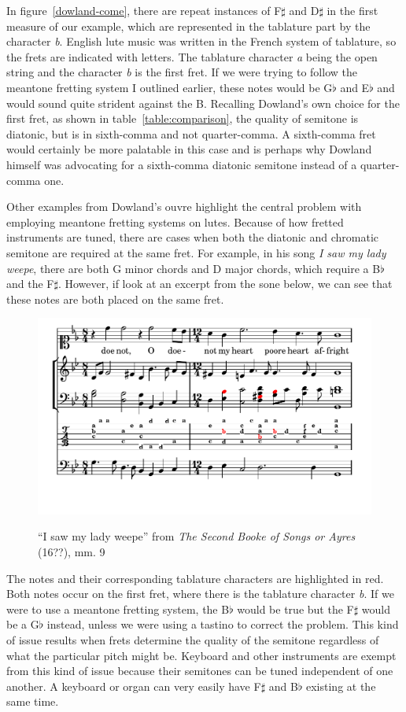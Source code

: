 In figure~\ref{dowland-come}, there are repeat instances of F$\sharp$ and D$\sharp$ in the
first measure of our example, which are represented in the tablature part by the character
\textit{b}.  English lute music was written in the French system of tablature, so the
frets are indicated with letters.  The tablature character \textit{a} being the open
string and the character \textit{b} is the first fret.  If we were trying to follow the
meantone fretting system I outlined earlier, these notes would be G$\flat$ and E$\flat$
and would sound quite strident against the B.  Recalling Dowland's own choice for the
first fret, as shown in table~\ref{table:comparison}, the quality of semitone is diatonic,
but is in sixth-comma and not quarter-comma.  A sixth-comma fret would certainly be more
palatable in this case and is perhaps why Dowland himself was advocating for a sixth-comma
diatonic semitone instead of a quarter-comma one.

Other examples from Dowland's ouvre highlight the central problem with employing meantone
fretting systems on lutes.  Because of how fretted instruments are tuned, there are cases
when both the diatonic and chromatic semitone are required at the same fret. For example,
in his song \textit{I saw my lady weepe}, there are both G minor chords and D major
chords, which require a B$\flat$ and the F$\sharp$.   However, if look at an excerpt from
the sone below, we can see that these notes are both placed on the same fret.
\begin{figure}[h]
\centering
\includegraphics{examples/saw.pdf}
\label{dowland-saw}
\caption{``I saw my lady weepe'' from \textit{The Second Booke of Songs or Ayres} (16??), mm. 9}
\end{figure}
The notes and their corresponding tablature characters are highlighted in red.  Both notes
occur on the first fret, where there is the tablature character \textit{b}.  If we were to
use a meantone fretting system, the B$\flat$ would be true but the F$\sharp$ would be a
G$\flat$ instead, unless we were using a tastino to correct the problem. This kind of
issue results when frets determine the quality of the semitone regardless of what the
particular pitch might be.  Keyboard and other instruments are exempt from this kind of
issue because their semitones can be tuned independent of one another.  A keyboard or
organ can very easily have F$\sharp$ and B$\flat$ existing at the same time.

